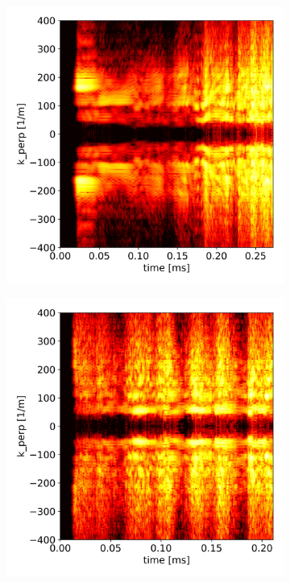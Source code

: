 \begin{figure}[H]\centering
	\begin{subfigure}[t]{0.45\textwidth}
		\centering
		\includegraphics[width=1\textwidth]{schemes/k_perp_time_spec1_n_PHI.jpg}
		\label{fig:CIRC_evolutionKperp_PHI}
	\end{subfigure}
	\begin{subfigure}[t]{0.45\textwidth}
		\centering
		\includegraphics[width=1\textwidth]{schemes/k_perp_time_spec1_n_flutter.jpg}

\end{subfigure}
\end{figure}
